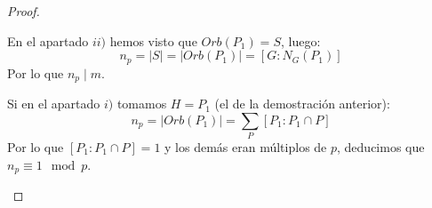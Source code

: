\begin{teo}
\begin{proof}
\begin{enumerate}
                En el apartado $ii)$ hemos visto que $Orb(P_1) = S$, luego:
                \begin{equation*}
                    n_p = |S| = |Orb(P_1)| = [G:N_G(P_1)]
                \end{equation*}
                Por lo que $n_p\mid m$.\newline

                Si en el apartado $i)$ tomamos $H=P_1$ (el de la demostración anterior):
                \begin{equation*}
                    n_p = |Orb(P_1)| = \sum_{P} [P_1:P_1\cap P]
                \end{equation*}
                Por lo que $[P_1:P_1\cap P] = 1$ y los demás eran múltiplos de $p$, deducimos que $n_p\equiv 1\mod p$.
        \end{enumerate}
    \end{proof}
\end{teo}


